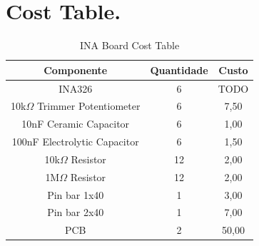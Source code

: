 \chapter{Cost Table.}

\begin{table}[htb]
  \begin{center}
    \ABNTEXreducedfont
    \caption[INA Board Cost Table]{INA Board Cost Table}
    \label{Cost-table}
    \begin{tabular}{|c|c|c|}
      \hline
    Componente & Quantidade & Custo \\ \hline
    INA326 & 6 & TODO\\ \hline
    10k$\Omega$ Trimmer Potentiometer & 6 & 7,50 \\ \hline
    10nF Ceramic Capacitor & 6 & 1,00 \\ \hline
    100nF Electrolytic Capacitor & 6 & 1,50 \\ \hline
    10k$\Omega$ Resistor & 12 & 2,00 \\ \hline
    1M$\Omega$ Resistor & 12 & 2,00 \\ \hline
    Pin bar 1x40 & 1 & 3,00 \\ \hline
    Pin bar 2x40 & 1 & 7,00 \\ \hline
    PCB & 2 & 50,00 \\ \hline
  \end{tabular}
\end{center}
\end{table}
